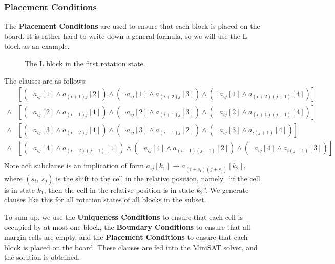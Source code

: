 \documentclass[12pt, a4paper]{article}
\newcommand{\degree}{^\circ}
\theoremstyle{mystyle}
\begin{document}
        \subsubsection{Placement Conditions}
        The \textbf{Placement Conditions} are used to ensure that each block is placed on the board. It is rather hard to write down a general formula, so we will use the L block as an example.
        \begin{figure}[H]
            \centering
            \caption{The L block in the first rotation state.}
        \end{figure}
        The clauses are as follows:
        \begin{align*}
            &\left[(\lnot a_{ij}[1] \land a_{(i+1)j}[2])\land(\lnot a_{ij}[1] \land a_{(i+2)j}[3])\land(\lnot a_{ij}[1] \land a_{(i+2)(j+1)}[4])\right]\\
            \land&\left[(\lnot a_{ij}[2] \land a_{(i-1)j}[1])\land(\lnot a_{ij}[2] \land a_{(i+1)j}[3])\land(\lnot a_{ij}[2] \land a_{(i+1)(j+1)}[4])\right]\\
            \land&\left[(\lnot a_{ij}[3] \land a_{(i-2)j}[1])\land(\lnot a_{ij}[3] \land a_{(i-1)j}[2])\land(\lnot a_{ij}[3] \land a_{i(j+1)}[4])\right]\\
            \land&\left[(\lnot a_{ij}[4] \land a_{(i-2)(j-1)}[1])\land(\lnot a_{ij}[4] \land a_{(i-1)(j-1)}[2])\land(\lnot a_{ij}[4] \land a_{i(j-1)}[3])\right]\\
        \end{align*}
        Note ach subclause is an implication of form $a_{ij}[k_1]\rightarrow a_{(i+s_i)(j+s_j)}[k_2]$, where $(s_i,\ s_j)$ is the shift to the cell in the relative position, namely, ``if the cell is in state $k_1$, then the cell in the relative position is in state $k_2$''. We generate clauses like this for all rotation states of all blocks in the subset.\par 
        To sum up, we use the \textbf{Uniqueness Conditions} to ensure that each cell is occupied by at most one block, the \textbf{Boundary Conditions} to ensure that all margin cells are empty, and the \textbf{Placement Conditions} to ensure that each block is placed on the board. These clauses are fed into the \textsf{MiniSAT} solver, and the solution is obtained.
\end{document}
